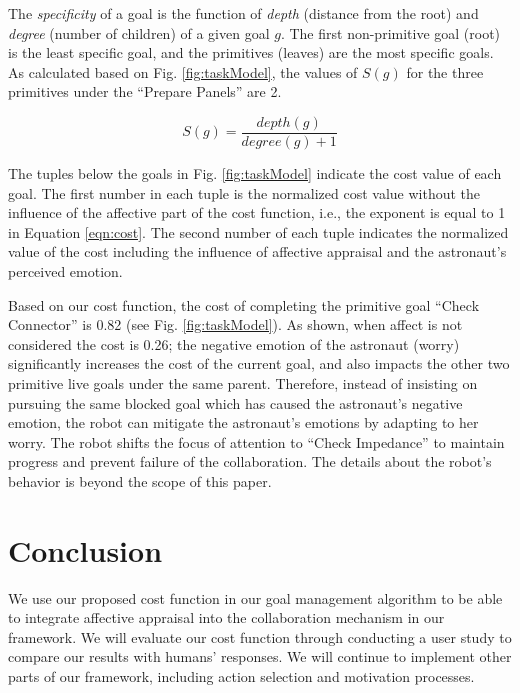 \documentclass[conference]{IEEEtran}
\begin{document}
The \textit{specificity} of a goal is the function of \textit{depth} (distance
from the root) and \textit{degree} (number of children) of a given goal $g$. The
first non-primitive goal (root) is the least specific goal, and the
primitives (leaves) are the most specific goals. As calculated based on Fig.
\ref{fig:taskModel}, the values of $S(g)$ for the three primitives under the
``Prepare Panels'' are 2.

\vspace*{-2mm}
\begin{equation}
S(g) = \frac{depth(g)}{degree(g)+1}
\label{eqn:specificity}
\end{equation}

\vspace*{-1mm}
The tuples below the goals in Fig. \ref{fig:taskModel} indicate the cost value
of each goal. The first number in each tuple is the normalized cost value
without the influence of the affective part of the cost function, i.e., the
exponent is equal to 1 in Equation \ref{eqn:cost}. The second number of each
tuple indicates the normalized value of the cost including the influence of
affective appraisal and the astronaut's perceived emotion.

Based on our cost function, the cost of completing the primitive goal ``Check
Connector'' is 0.82 (see Fig. \ref{fig:taskModel}). As shown, when affect is
not considered the cost is 0.26; the negative emotion of the astronaut (worry)
significantly increases the cost of the current goal, and also impacts the other
two primitive live goals under the same parent. Therefore, instead of insisting
on pursuing the same blocked goal which has caused the astronaut's negative
emotion, the robot can mitigate the astronaut's emotions by adapting to her
worry. The robot shifts the focus of attention to ``Check Impedance'' to
maintain progress and prevent failure of the collaboration. The details about
the robot's behavior is beyond the scope of this paper.

\vspace*{-1mm}
\section{Conclusion}
\vspace*{-1mm}
We use our proposed cost function in our goal management algorithm to be able to
integrate affective appraisal into the collaboration mechanism in our framework.
We will evaluate our cost function through conducting a user study to compare
our results with humans' responses. We will continue to implement other parts of
our framework, including action selection and motivation processes.
\vspace*{-1mm}



\end{document}
